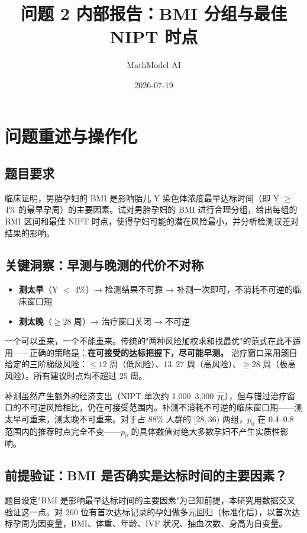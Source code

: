 \documentclass{internal-report}
\title{问题 2 内部报告：BMI 分组与最佳 NIPT 时点}
\author{MathModel AI}
\date{2026-07-19}
\begin{document}
\maketitle

\section{问题重述与操作化}

\subsection{题目要求}

临床证明，男胎孕妇的 BMI 是影响胎儿 Y 染色体浓度最早达标时间（即 Y $\geq$ 4\% 的最早孕周）的主要因素。试对男胎孕妇的 BMI 进行合理分组，给出每组的 BMI 区间和最佳 NIPT 时点，使得孕妇可能的潜在风险最小，并分析检测误差对结果的影响。

\subsection{关键洞察：早测与晚测的代价不对称}

\begin{itemize}
    \item \textbf{测太早}（Y $\!<\!$ 4\%）→ 检测结果不可靠 → 补测一次即可，不消耗不可逆的临床窗口期
    \item \textbf{测太晚}（$\geq 28$ 周）→ 治疗窗口关闭 → 不可逆
\end{itemize}

一个可以重来，一个不能重来。传统的"两种风险加权求和找最优"的范式在此不适用——正确的策略是：\textbf{在可接受的达标把握下，尽可能早测。} 治疗窗口采用题目给定的三阶梯级风险：$\leq 12$ 周（低风险）、13--27 周（高风险）、$\geq 28$ 周（极高风险）。所有建议时点均不超过 25 周。

补测虽然产生额外的经济支出（NIPT 单次约 1,000--3,000 元），但与错过治疗窗口的不可逆风险相比，仍在可接受范围内。补测不消耗不可逆的临床窗口期——测太早可重来，测太晚不可重来。对于占 88\% 人群的 $[28,36)$ 两组，$p_0$ 在 0.4--0.8 范围内的推荐时点完全不变——$p_0$ 的具体数值对绝大多数孕妇不产生实质性影响。

\subsection{前提验证：BMI 是否确实是达标时间的主要因素？}

题目设定"BMI 是影响最早达标时间的主要因素"为已知前提，本研究用数据交叉验证这一点。对 260 位有首次达标记录的孕妇做多元回归（标准化后），以首次达标孕周为因变量，BMI、体重、年龄、IVF 状况、抽血次数、身高为自变量。
\end{document}
